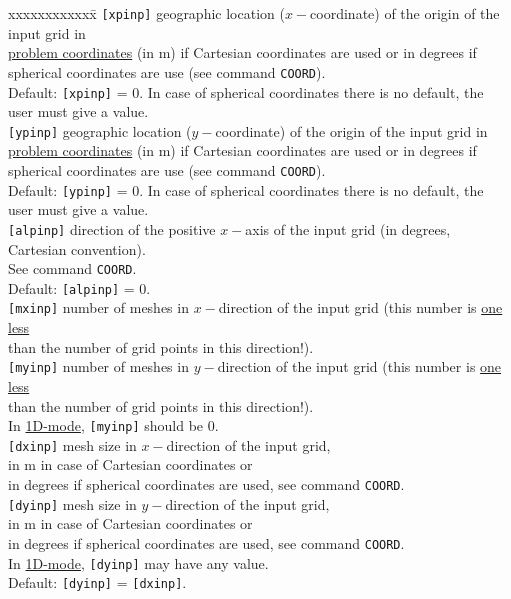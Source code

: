 \documentclass[12pt]{book}
\begin{document}
\begin{tabbing}
xxxxxxxxxxxx\= \kill
{\tt [xpinp]}       \> geographic location ($x-$coordinate) of the origin of the input grid in\+\\
                       \underline{problem coordinates} (in m) if Cartesian coordinates are used or in degrees if\\
                       spherical coordinates are use (see command {\tt COORD}).\\
                       Default: {\tt [xpinp]} = 0. In case of spherical coordinates there is no default, the\\
                       user must give a value.\-\\
{\tt [ypinp]}       \> geographic location ($y-$coordinate) of the origin of the input grid in\+\\
                       \underline{problem coordinates} (in m) if Cartesian coordinates are used or in degrees if\\
                       spherical coordinates are use (see command {\tt COORD}).\\
                       Default: {\tt [ypinp]} = 0. In case of spherical coordinates there is no default, the\\
                       user must give a value.\-\\
{\tt [alpinp]}      \> direction of the positive $x-$axis of the input grid (in degrees, Cartesian convention).\+\\
                       See command {\tt COORD}.\\
                       Default: {\tt [alpinp]} = 0.\-\\
{\tt [mxinp]}       \> number of meshes in $x-$direction of the input grid (this number is \underline{one less}\+\\
                       than the number of grid points in this direction!).\-\\
{\tt [myinp]}       \> number of meshes in $y-$direction of the input grid (this number is \underline{one less}\+\\
                       than the number of grid points in this direction!).\\
                       In \underline{1D-mode}, {\tt [myinp]} should be 0.\-\\
{\tt [dxinp]}       \> mesh size in $x-$direction of the input grid,\+\\
                       in m in case of Cartesian coordinates or\\
                       in degrees if spherical coordinates are used, see command {\tt COORD}.\-\\
{\tt [dyinp]}       \> mesh size in $y-$direction of the input grid,\+\\
                       in m in case of Cartesian coordinates or\\
                       in degrees if spherical coordinates are used, see command {\tt COORD}.\\
                       In \underline{1D-mode}, {\tt [dyinp]} may have any value.\\
                       Default: {\tt [dyinp]} = {\tt [dxinp]}.\-\\
\end{tabbing}
\end{document}
